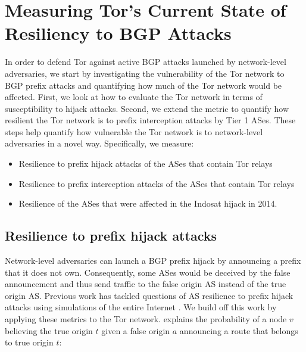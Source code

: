 \section{Measuring Tor's Current State of Resiliency to BGP Attacks}
\label{hijack_interception_measurement}

In order to defend Tor against active BGP attacks launched by network-level adversaries, we start by investigating the vulnerability of the Tor network to BGP prefix attacks and quantifying how much of the Tor network would be affected. First, we look at how to evaluate the Tor network in terms of susceptibility to hijack attacks. Second, we extend the metric to quantify how resilient the Tor network is to prefix interception attacks by Tier 1 ASes. These steps help quantify how vulnerable the Tor network is to network-level adversaries in a novel way.  Specifically, we measure:

\begin{itemize}
\item Resilience to prefix hijack attacks of the ASes that contain Tor relays
\item Resilience to prefix interception attacks of the ASes that contain Tor relays
\item Resilience of the ASes that were affected in the Indosat hijack in 2014. 
\end{itemize}

\subsection{Resilience to prefix hijack attacks}
\label{hijack_methodology}

Network-level adversaries can launch a BGP prefix hijack by announcing a prefix that it does not own. Consequently, some ASes would be deceived by the false announcement and thus send traffic to the false origin AS instead of the true origin AS. Previous work has tackled questions of AS resilience to prefix hijack attacks using simulations of the entire Internet \cite{lad2007understanding}.  We build off this work by applying these metrics to the Tor network. \cite{lad2007understanding} explains the probability of a node $v$ believing the true origin $t$ given a false origin $a$ announcing a route that belongs to true origin $t$:

